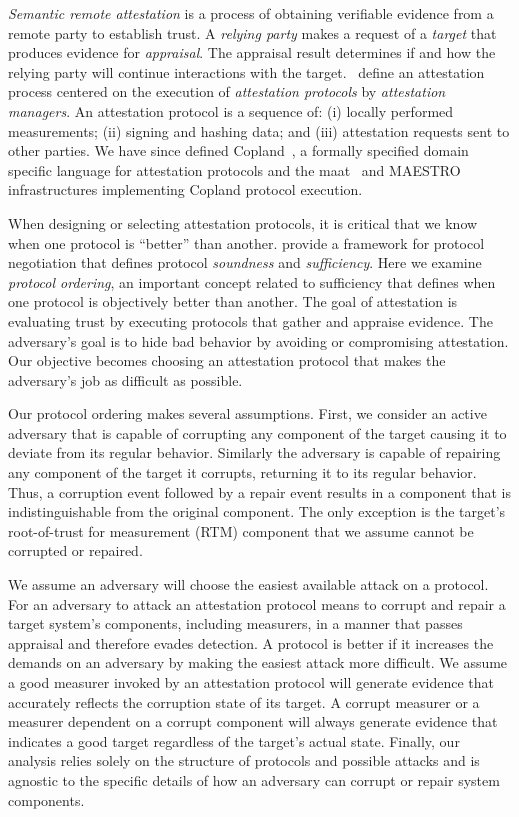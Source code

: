 \documentclass[runningheads]{llncs}
\theoremstyle{definition}
\begin{document}
\emph{Semantic remote
  attestation}\citep{Haldar:04:Semantic-Remote,coker2011principles} is
a process of obtaining verifiable evidence from a remote party to
establish trust.  A \emph{relying party} makes a request of a
\emph{target} that produces evidence for \emph{appraisal}. The
appraisal result determines if and how the relying party will continue
interactions with the target.  \citet{Coker::Principles-of-R}~define
an attestation process centered on the execution of \emph{attestation
  protocols} by \emph{attestation managers}.  An attestation protocol
is a sequence of: (i) locally performed measurements; (ii) signing and
hashing data; and (iii) attestation requests sent to other parties.
We have since defined Copland~\citep{Rowe:2019:Orchestrating}, a
formally specified domain specific language for attestation protocols
and the maat~\citep{Pendergrass:2018:Maat} and
MAESTRO~\citep{Petz:2021:faithful} infrastructures implementing
Copland protocol execution.

When designing or selecting attestation protocols, it is critical that
we know when one protocol is ``better'' than another.
\citet{Fritz:2023:framework} provide a framework for protocol
negotiation that defines protocol \emph{soundness} and
\emph{sufficiency}.  Here we examine \emph{protocol ordering}, an
important concept related to sufficiency that defines when one
protocol is objectively better than another.  The goal of attestation
is evaluating trust by executing protocols that gather and appraise
evidence.  The adversary's goal is to hide bad behavior by avoiding or
compromising attestation.  Our objective becomes choosing an
attestation protocol that makes the adversary's job as difficult as
possible.

Our protocol ordering makes several assumptions. First, we consider an
active adversary that is capable of corrupting any component of the
target causing it to deviate from its regular behavior.  Similarly the
adversary is capable of repairing any component of the target it
corrupts, returning it to its regular behavior. Thus, a corruption
event followed by a repair event results in a component that is
indistinguishable from the original component. The only exception is
the target's root-of-trust for measurement (RTM) component that we
assume cannot be corrupted or repaired.

We assume an adversary will choose the easiest available attack on a
protocol.  For an adversary to attack an attestation protocol means to
corrupt and repair a target system's components, including measurers,
in a manner that passes appraisal and therefore evades detection.  A
protocol is better if it increases the demands on an adversary by
making the easiest attack more difficult.  We assume a good measurer
invoked by an attestation protocol will generate evidence that
accurately reflects the corruption state of its target.  A corrupt
measurer or a measurer dependent on a corrupt component will always
generate evidence that indicates a good target regardless of the
target's actual state.  Finally, our analysis relies solely on the
structure of protocols and possible attacks and is agnostic to the
specific details of how an adversary can corrupt or repair system
components.
\end{document}
